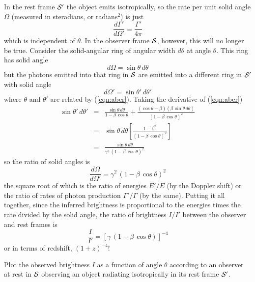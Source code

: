 In the rest frame $\cal S'$ the object emits isotropically, so the
rate per unit solid angle $\Omega$ (measured in steradians, or
radians$^2$) is just
\begin{equation}
\frac{d\Gamma'}{d\Omega'}=\frac{\Gamma'}{4\pi}
\end{equation}
which is independent of $\theta$.  In the observer frame $\cal S$,
however, this will no longer be true.  Consider the solid-angular ring
of angular width $d\theta$ at angle $\theta$.  This ring has solid
angle
\begin{equation}
d\Omega = \sin\theta\, d\theta
\end{equation}
but the photons emitted into that ring in $\cal S$ are emitted into a
different ring in $\cal S'$ with solid angle
\begin{equation}
d\Omega' = \sin\theta'\, d\theta'
\end{equation}
where $\theta$ and $\theta'$ are related by (\ref{eqn:aber}).  Taking
the derivative of (\ref{eqn:aber})
\begin{eqnarray}
\sin\theta'\,d\theta' & = & \frac{\sin\theta\,d\theta}{1-\beta\,\cos\theta}
  + \frac{(\cos\theta-\beta)(\beta\,\sin\theta\,d\theta)}
         {(1-\beta\,\cos\theta)^2} \nonumber \\
 & = & \sin\theta\,d\theta \left[\frac{1-\beta^2}
         {(1-\beta\,\cos\theta)^2}\right] \nonumber \\
 & = & \frac{\sin\theta\,d\theta}{\gamma^2\,(1-\beta\,\cos\theta)^2}
\end{eqnarray}
so the ratio of solid angles is
\begin{equation}
\frac{d\Omega}{d\Omega'}=\gamma^2\,(1-\beta\,\cos\theta)^2
\end{equation}
the square root of which is the ratio of energies $E'/E$ (by the
Doppler shift) or the ratio of rates of photon production
$\Gamma'/\Gamma$ (by the same).  Putting it all together, since the
inferred brightness is proportional to the energies times the rate
divided by the solid angle, the ratio of brightness $I/I'$ between the
observer and rest frames is
\begin{equation}
\frac{I}{I'} = \left[\gamma\,(1-\beta\,\cos\theta)\right]^{-4}
\end{equation}
or in terms of redshift, $(1+z)^{-4}$!

\begin{problem}
Plot the observed brightness $I$ as a function of angle $\theta$
according to an observer at rest in $\cal S$ observing an object
radiating isotropically in its rest frame $\cal S'$.
\end{problem}


